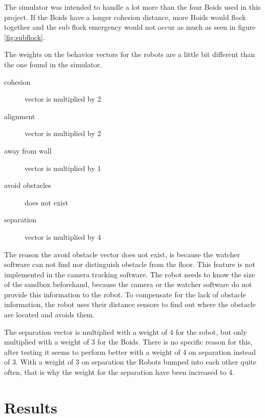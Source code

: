 The simulator was intended to handle a lot more than the four Boids used in this project. If the Boids have a longer cohesion distance, more Boids would flock together and the sub flock emergency would not occur as much as seen in figure \ref{fig:subflock}.

The weights on the behavior vectors for the robots are a little bit different than the one found in the simulator.
\begin{description}
\item[cohesion] vector is multiplied by 2
\item[alignment] vector is multiplied by 2
\item[away from wall] vector is multiplied by 1
\item[avoid obstacles] does not exist
\item[separation] vector is multiplied by 4
\end{description}

The reason the avoid obstacle vector does not exist, is because the watcher software can not find nor distinguish obstacle from the floor. This feature is not implemented in the camera tracking software. The robot needs to know the size of the sandbox beforehand, because the camera or the watcher software do not provide this information to the robot. To compensate for the lack of obstacle information, the robot uses their distance sensors to find out where the obstacle are located and avoids them.

The separation vector is multiplied with a weight of 4 for the robot, but only multiplied with a weight of 3 for the Boids. There is no specific reason for this, after testing it seems to perform better with a weight of 4 on separation instead of 3.
With a weight of 3 on separation the Robots bumped into each other quite often, that is why the weight for the separation have been increased to 4.




\section{Results}
\label{sec:results}

